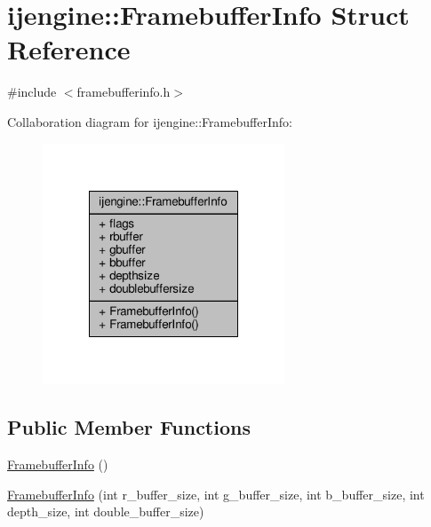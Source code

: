 \hypertarget{structijengine_1_1FramebufferInfo}{\section{ijengine\-:\-:Framebuffer\-Info Struct Reference}
\label{structijengine_1_1FramebufferInfo}
}


{\ttfamily \#include $<$framebufferinfo.\-h$>$}



Collaboration diagram for ijengine\-:\-:Framebuffer\-Info\-:\nopagebreak
\begin{figure}[H]
\begin{center}
\leavevmode
\includegraphics[width=204pt]{structijengine_1_1FramebufferInfo__coll__graph}
\end{center}
\end{figure}
\subsection*{Public Member Functions}
\begin{DoxyCompactItemize}
\item 
\hyperlink{structijengine_1_1FramebufferInfo_a507eb4b030e4818df4f4cf8591484fd0}{Framebuffer\-Info} ()
\item 
\hyperlink{structijengine_1_1FramebufferInfo_ab09fee22e3623d28a46cf8138d7b7761}{Framebuffer\-Info} (int r\-\_\-buffer\-\_\-size, int g\-\_\-buffer\-\_\-size, int b\-\_\-buffer\-\_\-size, int depth\-\_\-size, int double\-\_\-buffer\-\_\-size)
\end{DoxyCompactItemize}
